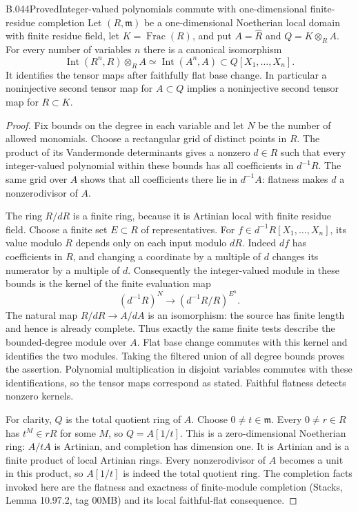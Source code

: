 \begin{saresult}{B.044}{Proved}{Integer-valued polynomials commute with one-dimensional finite-residue completion}
Let $(R,\mathfrak m)$ be a one-dimensional Noetherian local
domain with finite residue field, let $K=\operatorname{Frac}(R)$,
and put $A=\widehat R$ and $Q=K\otimes_R A$.
For every number of variables $n$ there is a canonical isomorphism
\[
 \operatorname{Int}(R^n,R)\otimes_R A
       \simeq \operatorname{Int}(A^n,A)\subset Q[X_1,\ldots,X_n].
\]
It identifies the tensor maps after faithfully flat base change.
In particular a noninjective second tensor map for $A\subset Q$
implies a noninjective second tensor map for $R\subset K$.
\end{saresult}
\begin{proof}
Fix bounds on the degree in each variable and let $N$ be the
number of allowed monomials. Choose a rectangular grid of
distinct points in $R$. The product of its Vandermonde
determinants gives a nonzero $d\in R$ such that every
integer-valued polynomial within these bounds has all
coefficients in $d^{-1}R$. The same grid over $A$ shows that
all coefficients there lie in $d^{-1}A$: flatness makes $d$
a nonzerodivisor of $A$.

The ring $R/dR$ is a finite ring, because it is Artinian local
with finite residue field. Choose a finite set $E\subset R$
of representatives. For $f\in d^{-1}R[X_1,\ldots,X_n]$,
its value modulo $R$ depends only on each input modulo $dR$.
Indeed $df$ has coefficients in $R$, and changing a coordinate
by a multiple of $d$ changes its numerator by a multiple of
$d$. Consequently the integer-valued module in these bounds
is the kernel of the finite evaluation map
\[
 (d^{-1}R)^N\longrightarrow (d^{-1}R/R)^{E^n}.
\]
The natural map $R/dR\to A/dA$ is an isomorphism: the source
has finite length and hence is already complete. Thus exactly
the same finite tests describe the bounded-degree module over
$A$. Flat base change commutes with this kernel and identifies
the two modules. Taking the filtered union of all degree
bounds proves the assertion. Polynomial multiplication in
disjoint variables commutes with these identifications, so
the tensor maps correspond as stated. Faithful flatness
detects nonzero kernels.

For clarity, $Q$ is the total quotient ring of $A$. Choose
$0\ne t\in\mathfrak m$. Every $0\ne r\in R$ has
$t^M\in rR$ for some $M$, so $Q=A[1/t]$. This is a
zero-dimensional Noetherian ring: $A/tA$ is Artinian, and
completion has dimension one. It is Artinian and is a
finite product of local Artinian rings. Every nonzerodivisor
of $A$ becomes a unit in this product, so $A[1/t]$ is indeed
the total quotient ring.
The completion facts invoked here are the flatness and exactness
of finite-module completion (Stacks, Lemma 10.97.2, tag 00MB)
and its local faithful-flat consequence.
\end{proof}

